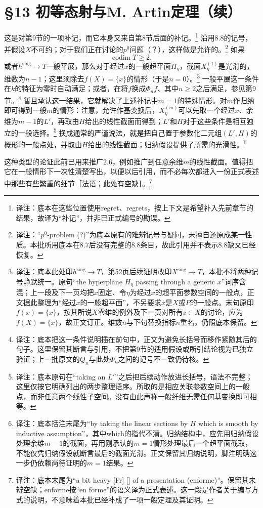 \documentclass[openany,fontset=fandol]{ctexbook}
\newcommand{\note}[1]{\footnote{译注：#1}}
\begin{document}
\chapter*{§13 初等态射与M. Artin定理（续）}
这是对第9节的一项补记，而它本身又来自第8节后面的补记。\note{底本在这些位置使用regret、regrets，按上下文是希望补入先前章节的结果，故译为“补记”，并非已正式编号的勘误。}
沿用8.8的记号，并假设$X$不可约；对于我们正在讨论的$p^0$问题（？），这样做是允许的。\note{“$p^0$-problem (?)”为底本原有的难辨记号与疑问，未擅自还原成某一性质。本批所用底本在8.7后没有完整的8.8条目，故此引用并不表示8.8缺文已经恢复。}
如果
\[
\operatorname{codim}T\geq2,
\]
或者$h^{\mathrm{sing}}\to T$一般平展，那么对于经过$x$的一般超平面$H_\eta$，截面$X^{(1)}_\eta$是光滑的，维数为$n-1$；这里须除去$f(X)=\{x\}$的情形（于是$n=0$）。\note{底本此处印$h^{\mathrm{sing}}\to T$，第52页后续证明改印$X^{\mathrm{sing}}\to T$，本批不将两种记号静默统一。原句“the hyperplane $H_\eta$ passing through a generic $x$”词序含混；上一段及下一页均把$x$固定、令$\eta$为经过$x$的超平面参数空间的一般点，正文据此整理为“经过$x$的一般超平面”，不另要求$x$是$X$或$P$的一般点。末句原印$f(x)=\{x\}$，按其所说$X$零维的例外及下一页对所有$z\in X$的讨论，应为$f(X)=\{x\}$，故正文订正。维数$n$与下句替换指标$n$重名，仍照底本保留。}
一般平展这一条件在$k$的特征为零时自动满足；或者，在将$f$换成$\Phi_n f$、其中$n\geq2$之后满足，参见第9节。\note{底本把这一条件说明插在前句中，正文为避免长括号而移作紧随其后的句子。这里保留其断言与引用，不把第9节的适用假设或所引结论视为已独立验证；上一批原文的$Q_n$与此处$\Phi_n$之间的记号不一致仍待核。}
\newpage
暂且承认这一结果，它就解决了上述补记中$m=1$的特殊情形。对$m$作归纳即可得到一般$m$的情形：注意，允许作基变换后，$X^{(m)}_\eta$可以先取一个经过$x$、余维为$m-1$的$L'$，再取由$H$给出的线性截面而得到；$L'$和$H$对于这些条件是相互独立的一般选择。\note{底本原句在“taking an $L'$”之后把后续动作放进长括号，语法不完整；这里仅按它明确列出的两步整理语序。所取的是相应关联参数空间上的一般点，而非任意两个线性子空间。没有由此声称一般纤维无需任何基变换即可相等。}
换成通常的严谨说法，就是把自己置于参数化二元组$(L',H)$的概形的一般点处，并取由$H$给出的线性截面；归纳假设提供了所需的光滑性。\note{底本括注末尾为“by taking the linear sections by $H$ which is smooth by inductive assumption”，其中which的指代不清。归纳结构中，应先用归纳假设处理余维$m-1$的截面，再用刚承认的$m=1$情形处理最后一个超平面截取，不能仅凭归纳假设就断言最后的截面光滑。正文保留其归纳说明，脚注明确这一步仍依赖尚待证明的$m=1$结果。}

这种类型的论证此前已用来推广2.6，例如推广到任意余维$m$的线性截面。值得把它在一般情形下一次性清楚写出，以便以后引用，而不必每次都进入一份正式表述中那些有些繁重的细节［法语；此处有空缺］。\note{底本末尾为“a bit heavy [Fr] [\quad] of a presentation (enforme)”。保留其未辨空缺；enforme按“en forme”的语义译为正式表述。这一段是作者关于编写方式的说明，不意味着本批已经补成了一项一般定理及其证明。}
\end{document}
